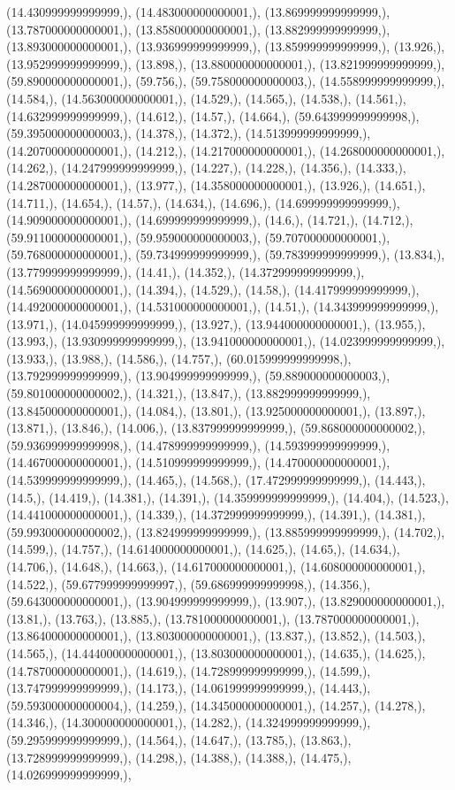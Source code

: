 \documentclass{article}
\begin{document}
(14.430999999999999,), (14.483000000000001,), (13.869999999999999,), (13.787000000000001,), (13.858000000000001,), (13.882999999999999,), (13.893000000000001,), (13.936999999999999,), (13.859999999999999,), (13.926,), (13.952999999999999,), (13.898,), (13.880000000000001,), (13.821999999999999,), (59.890000000000001,), (59.756,), (59.758000000000003,), (14.558999999999999,), (14.584,), (14.563000000000001,), (14.529,), (14.565,), (14.538,), (14.561,), (14.632999999999999,), (14.612,), (14.57,), (14.664,), (59.643999999999998,), (59.395000000000003,), (14.378,), (14.372,), (14.513999999999999,), (14.207000000000001,), (14.212,), (14.217000000000001,), (14.268000000000001,), (14.262,), (14.247999999999999,), (14.227,), (14.228,), (14.356,), (14.333,), (14.287000000000001,), (13.977,), (14.358000000000001,), (13.926,), (14.651,), (14.711,), (14.654,), (14.57,), (14.634,), (14.696,), (14.699999999999999,), (14.909000000000001,), (14.699999999999999,), (14.6,), (14.721,), (14.712,), (59.911000000000001,), (59.959000000000003,), (59.707000000000001,), (59.768000000000001,), (59.734999999999999,), (59.783999999999999,), (13.834,), (13.779999999999999,), (14.41,), (14.352,), (14.372999999999999,), (14.569000000000001,), (14.394,), (14.529,), (14.58,), (14.417999999999999,), (14.492000000000001,), (14.531000000000001,), (14.51,), (14.343999999999999,), (13.971,), (14.045999999999999,), (13.927,), (13.944000000000001,), (13.955,), (13.993,), (13.930999999999999,), (13.941000000000001,), (14.023999999999999,), (13.933,), (13.988,), (14.586,), (14.757,), (60.015999999999998,), (13.792999999999999,), (13.904999999999999,), (59.889000000000003,), (59.801000000000002,), (14.321,), (13.847,), (13.882999999999999,), (13.845000000000001,), (14.084,), (13.801,), (13.925000000000001,), (13.897,), (13.871,), (13.846,), (14.006,), (13.837999999999999,), (59.868000000000002,), (59.936999999999998,), (14.478999999999999,), (14.593999999999999,), (14.467000000000001,), (14.510999999999999,), (14.470000000000001,), (14.539999999999999,), (14.465,), (14.568,), (17.472999999999999,), (14.443,), (14.5,), (14.419,), (14.381,), (14.391,), (14.359999999999999,), (14.404,), (14.523,), (14.441000000000001,), (14.339,), (14.372999999999999,), (14.391,), (14.381,), (59.993000000000002,), (13.824999999999999,), (13.885999999999999,), (14.702,), (14.599,), (14.757,), (14.614000000000001,), (14.625,), (14.65,), (14.634,), (14.706,), (14.648,), (14.663,), (14.617000000000001,), (14.608000000000001,), (14.522,), (59.677999999999997,), (59.686999999999998,), (14.356,), (59.643000000000001,), (13.904999999999999,), (13.907,), (13.829000000000001,), (13.81,), (13.763,), (13.885,), (13.781000000000001,), (13.787000000000001,), (13.864000000000001,), (13.803000000000001,), (13.837,), (13.852,), (14.503,), (14.565,), (14.444000000000001,), (13.803000000000001,), (14.635,), (14.625,), (14.787000000000001,), (14.619,), (14.728999999999999,), (14.599,), (13.747999999999999,), (14.173,), (14.061999999999999,), (14.443,), (59.593000000000004,), (14.259,), (14.345000000000001,), (14.257,), (14.278,), (14.346,), (14.300000000000001,), (14.282,), (14.324999999999999,), (59.295999999999999,), (14.564,), (14.647,), (13.785,), (13.863,), (13.728999999999999,), (14.298,), (14.388,), (14.388,), (14.475,), (14.026999999999999,), 
\end{document}
